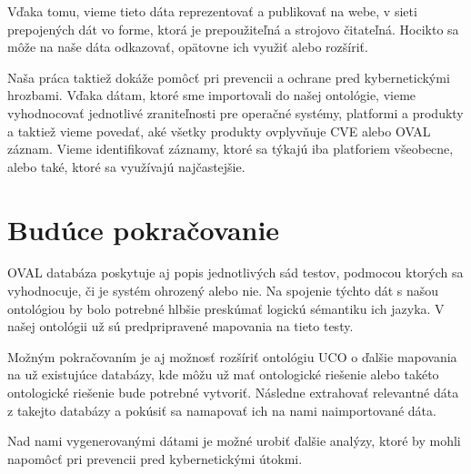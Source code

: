 \documentclass[12pt, a4paper, oneside]{book}
\begin{document}
Vďaka tomu, vieme tieto dáta reprezentovať a publikovať na webe, v sieti prepojených dát vo forme, ktorá je prepoužiteľná a
strojovo čitateľná. Hocikto sa môže na naše dáta odkazovať, opätovne ich využiť alebo rozšíriť. 

Naša práca taktiež dokáže pomôcť pri prevencii a ochrane pred
kybernetickými hrozbami. Vďaka dátam, ktoré sme importovali do našej ontológie, vieme vyhodnocovať jednotlivé zraniteľnosti pre operačné systémy, platformi a produkty a taktiež vieme povedať, aké všetky produkty ovplyvňuje CVE alebo OVAL záznam. Vieme identifikovať záznamy, ktoré sa týkajú iba platforiem všeobecne, alebo také, ktoré sa využívajú najčastejšie.


\section*{Budúce pokračovanie}
OVAL databáza poskytuje aj popis jednotlivých sád testov, podmocou ktorých sa vyhodnocuje, či je systém ohrozený alebo nie. Na spojenie týchto dát s našou ontológiou by bolo potrebné hlbšie preskúmať logickú sémantiku ich jazyka. V našej ontológii už sú predpripravené mapovania na tieto testy.


Možným pokračovaním je aj možnosť rozšíriť ontológiu UCO o ďalšie mapovania na už existujúce databázy, kde môžu už mať ontologické riešenie alebo takéto ontologické riešenie bude potrebné vytvoriť. Následne extrahovať relevantné dáta z takejto databázy a pokúsiť sa namapovať ich na nami naimportované dáta.


Nad nami vygenerovanými dátami je možné urobiť ďalšie analýzy, ktoré by mohli napomôcť pri prevencii pred kybernetickými útokmi.


\nocite{*}



\listoffigures
\end{document}
